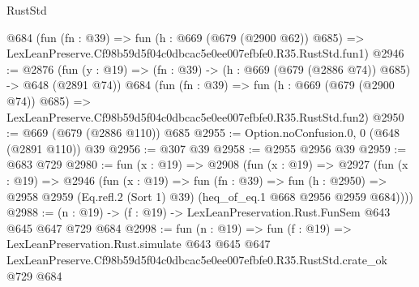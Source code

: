\begin{lexlean}{RustStd}
\begin{coremodule}
    @684
    (fun (fn : @39) =>
    fun (h : @669 (@679 (@2900 @62)) @685) =>
    LexLeanPreserve.Cf98b59d5f04c0dbcac5e0ee007efbfe0.R35.RustStd.fun1)
@2946 := @2876
    (fun (y : @19) => (fn : @39) -> (h : @669 (@679 (@2886 @74)) @685) -> @648 (@2891 @74))
    @684
    (fun (fn : @39) =>
    fun (h : @669 (@679 (@2900 @74)) @685) =>
    LexLeanPreserve.Cf98b59d5f04c0dbcac5e0ee007efbfe0.R35.RustStd.fun2)
@2950 := @669 (@679 (@2886 @110)) @685
@2955 := Option.noConfusion.{0, 0} (@648 (@2891 @110)) @39
@2956 := @307 @39
@2958 := @2955 @2956 @39
@2959 := @683 @729
@2980 := fun (x : @19) =>
  @2908
    (fun (x : @19) =>
    @2927
      (fun (x : @19) =>
      @2946
        (fun (x : @19) =>
        fun (fn : @39) =>
        fun (h : @2950) =>
        @2958 @2959 (Eq.refl.{2} (Sort 1) @39) (heq_of_eq.{1} @668 @2956 @2959 @684))))
@2988 := (n : @19) -> (f : @19) -> LexLeanPreservation.Rust.FunSem @643 @645 @647 @729 @684
@2998 := fun (n : @19) =>
  fun (f : @19) =>
  LexLeanPreservation.Rust.simulate
    @643
    @645
    @647
    LexLeanPreserve.Cf98b59d5f04c0dbcac5e0ee007efbfe0.R35.RustStd.crate_ok
    @729
    @684
\end{coremodule}
\end{lexlean}
